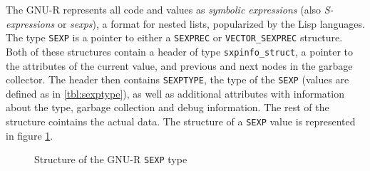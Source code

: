 The GNU-R represents all code and values as \textit{symbolic expressions} (also \textit{S-expressions} or \textit{sexps}), a format for nested lists, popularized by the Lisp languages. The type \texttt{SEXP} is a pointer to either a \texttt{SEXPREC} or \texttt{VECTOR\_SEXPREC} structure. Both of these structures contain a header of type \texttt{sxpinfo\_struct}, a pointer to the attributes of the current value, and previous and next nodes in the garbage collector. The header then contains \texttt{SEXPTYPE}, the type of the \texttt{SEXP} (values are defined as in \ref{tbl:sexptype}), as well as additional attributes with information about the type, garbage collection and debug information. The rest of the structure cointains the actual data. The structure of a \texttt{SEXP} value is represented in figure \ref{fig:sexp-struct}.

\begin{figure}
	\centering
	\begin{adjustbox}{trim=5pt 20pt 0 40pt, clip}
	\end{adjustbox}
	\caption{Structure of the GNU-R \texttt{SEXP} type}\label{fig:sexp-struct}
\end{figure}

